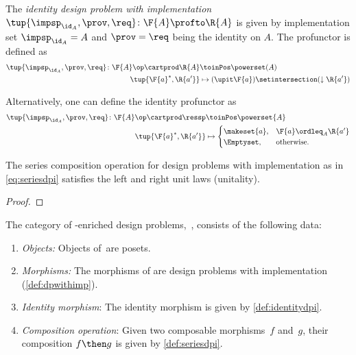 {    \begin{definition}
        \label{def:identitydpi}
        The \emph{identity design problem with implementation}~$\tup{\impsp_{\id_A},\prov,\req} \colon \F{A} \profto \R{A}$ is given by implementation set $\impsp_{\id_A} = A$ and $\prov=\req$ being the identity on $A$.
        The profunctor is defined as
        \begin{align}
            \tup{\impsp_{\id_A},\prov,\req} \colon \F{A}\op \cartprod \R{A} & \toinPos \powerset(A) \\
            \tup{\F{a}^*,\R{a'}}                                            & \mapsto (\upit \F{a}) \setintersection (\downarrow \R{a'})
        \end{align}
    \end{definition}
    \begin{remark}
        Alternatively, one can define the identity profunctor as
        \begin{align}
            \tup{\impsp_{\id_A},\prov,\req}\colon \F{A}\op \cartprod \ressp & \toinPos \powerset{A} \\
            \tup{\F{a}^*,\R{a'}}                                            & \mapsto
            \begin{cases}
                \makeset{a}, & \F{a}\ordleq_A \R{a'} \\
                \Emptyset,   & \text{otherwise}.
            \end{cases}
        \end{align}
    \end{remark}

    \begin{lemma}
        The series composition operation for design problems with implementation as in \cref{eq:seriesdpi} satisfies the left and right unit laws (unitality).
    \end{lemma}

    \begin{proof}
    \end{proof}

    \begin{definition}
        The category of \Set-enriched design problems,~\DPI, consists of the following data:
        \begin{enumerate}
            \item \emph{Objects:}
                  Objects of~\DPI are posets.
            \item \emph{Morphisms:}
                  The morphisms of \DPI are design problems with implementation (\cref{def:dpwithimp}).
            \item \emph{Identity morphism}: The identity morphism is given by \cref{def:identitydpi}.
            \item \emph{Composition operation}: Given two composable morphisms~$f$ and~$g$, their composition $f\then g$ is given by \cref{def:seriesdpi}.
        \end{enumerate}
    \end{definition}

}
